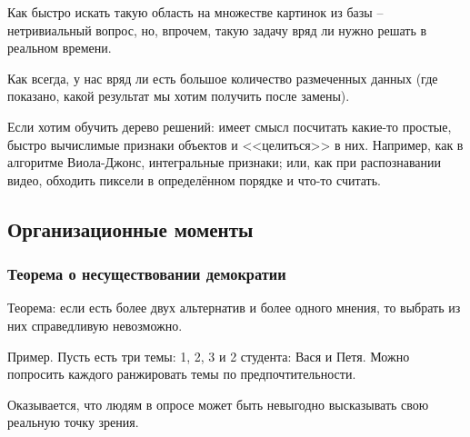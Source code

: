 \documentclass[main.tex]{subfiles}
\begin{document}
Как быстро искать такую область на множестве картинок из базы -- нетривиальный вопрос, но, впрочем, такую задачу вряд ли нужно решать в реальном времени.

Как всегда, у нас вряд ли есть большое количество размеченных данных (где показано, какой результат мы хотим получить после замены).

Если хотим обучить дерево решений: имеет смысл посчитать какие-то простые, быстро вычислимые признаки объектов и <<целиться>> в них.
Например, как в алгоритме Виола-Джонс, интегральные признаки; или, как при распознавании видео, обходить пиксели в определённом порядке и что-то считать.

\subsection{ Организационные моменты}

\subsubsection{ Теорема о несуществовании демократии }

Теорема: если есть более двух альтернатив и более одного мнения, то выбрать из них справедливую невозможно.

Пример.
Пусть есть три темы: 1, 2, 3 и 2 студента: Вася и Петя.
Можно попросить каждого ранжировать темы по предпочтительности.

Оказывается, что людям в опросе может быть невыгодно высказывать свою реальную точку зрения.
\end{document}
